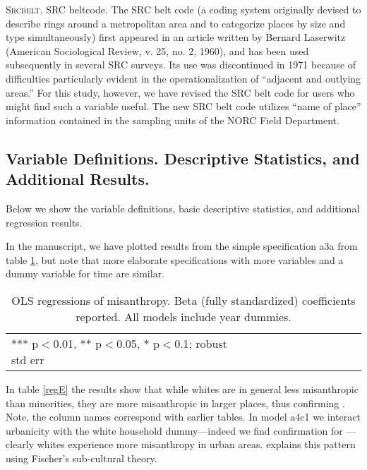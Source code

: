 \documentclass[11pt, letterpaper]{article}
\begin{document}
\begin{spacing}{1.4}
\textsc{Srcbelt}. SRC beltcode. The SRC belt code (a coding system originally devised to describe
rings around a metropolitan area and to categorize places by size
and type simultaneously) first appeared in an article written by
Bernard Laserwitz (American Sociological Review, v. 25, no. 2, 1960),
and has been used subsequently in several SRC surveys.
Its use was discontinued in 1971 because of difficulties particularly
evident in the operationalization of ``adjacent and outlying areas.''
For this study, however, we have revised the SRC belt code for users
who might find such a variable useful. The new SRC belt code utilizes
``name of place'' information contained in the sampling units
of the NORC Field Department.
    
\subsection{Variable Definitions. Descriptive Statistics, and Additional Results.}    
    
Below we show the variable definitions, basic descriptive statistics, and additional regression results.

{\footnotesize


}
 
 
 
 

\clearpage
In the manuscript, we have plotted results from the simple specification a3a
from table \ref{regDbyHand}, but note that more elaborate specifications with
more variables and a dummy variable for time are similar.

 \begin{spacing}{.67}
\begin{table}[H]\centering
\caption{OLS regressions  of misanthropy. Beta (fully standardized) coefficients
  reported. All models include year dummies.} \label{regDbyHand}
\begin{tiny} \begin{tabular}{p{1.2in}p{.45in}p{.45in}p{.45in}p{.45in}p{.45in}p{.45in}p{.45in}p{.45in}p{.45in}p{.45 in}}\hline
 \hline  *** p$<$0.01, ** p$<$0.05, * p$<$0.1; robust std err
\end{tabular}\end{tiny}\end{table}
 \end{spacing}

 
In table \ref{regE} the results show that while whites are in general less misanthropic
than minorities, they are more misanthropic in larger places, thus confirming
\citet{wilson85}. Note, the column names correspond with earlier tables.  
 In model a4c1 we interact urbanicity with the white household dummy---indeed we find confirmation for \citet{wilson85}---clearly whites experience more misanthropy in urban areas. \citet{wilson85} explains this
 pattern using Fischer's sub-cultural theory.


\end{spacing}
\end{document}
